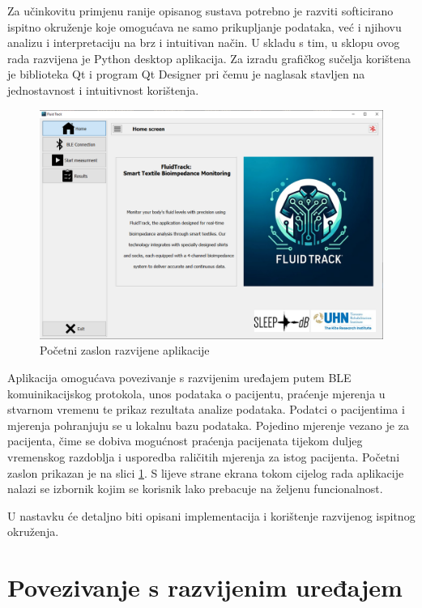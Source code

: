 \documentclass[../diplomski_rad.tex]{subfiles}
\begin{document}
\sloppy

\justifying

Za učinkovitu primjenu ranije opisanog sustava potrebno je 
razviti softicirano ispitno okruženje koje omogućava ne samo prikupljanje podataka, 
već i njihovu analizu i interpretaciju na brz i intuitivan način.
U skladu s tim, u sklopu ovog rada razvijena je Python desktop aplikacija. 
Za izradu grafičkog sučelja korištena je biblioteka Qt i program Qt Designer pri čemu je 
naglasak stavljen na jednostavnost i intuitivnost korištenja.

\begin{figure}[htb]
    \centering
    \includegraphics[width=1\textwidth]{Figures/home.png} 
    \caption{Početni zaslon razvijene aplikacije}
    \label{slk:home}
\end{figure}

Aplikacija omogućava povezivanje s razvijenim uređajem putem BLE komuinikacijskog protokola, 
unos podataka o pacijentu,  
praćenje mjerenja u stvarnom vremenu te prikaz rezultata analize podataka. 
Podatci o pacijentima i mjerenja pohranjuju se u lokalnu bazu podataka. 
Pojedino mjerenje vezano je za pacijenta, čime se dobiva mogućnost praćenja pacijenata 
tijekom duljeg vremenskog razdoblja i usporedba raličitih mjerenja za istog pacijenta.
Početni zaslon prikazan je na slici \ref{slk:home}. 
S lijeve strane ekrana tokom cijelog rada aplikacije nalazi se izbornik kojim se korisnik lako prebacuje 
na željenu funcionalnost. 

U nastavku će detaljno biti opisani implementacija i korištenje razvijenog ispitnog okruženja.

\section{Povezivanje s razvijenim uređajem}
\end{document}
